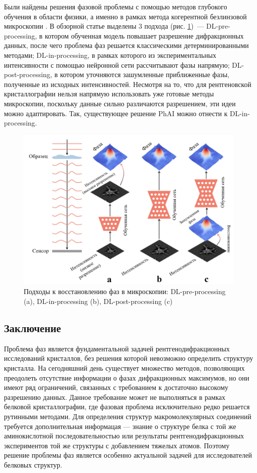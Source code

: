 Были найдены решения фазовой проблемы с помощью методов глубокого обучения в области физики, а именно в рамках метода когерентной безлинзовой микроскопии \cite{wang_use_2024}. В обзорной статье выделены 3 подхода (рис. \ref{dl})~--- DL-pre-processing, в котором обученная модель повышает разрешение дифракционных данных, после чего проблема фаз решается классическими детерминированными методами; DL-in-processing, в рамках которого из экспериментальных интенсивности с помощью нейронной сети рассчитывают фазы напрямую; DL-post-processing, в котором уточняются зашумленные приближенные фазы, полученные из исходных интенсивностей. Несмотря на то, что для рентгеновской кристаллографии нельзя напрямую использовать уже готовые методы микроскопии, поскольку данные сильно различаются разрешением, эти идеи можно адаптировать. Так, существующее решение PhAI \cite{larsen_phai_2024} можно отнести к DL-in-processing.

\begin{figure}[H]
	\centering
	\includegraphics[width=1\textwidth]{figures/dl.png}\hfill
	\caption{Подходы к восстановлению фаз в микроскопии: DL-pre-processing (a), DL-in-processing (b), DL-post-processing (c) \cite{wang_use_2024}}
	\label{dl}
\end{figure}

\subsection{Заключение}

Проблема фаз является фундаментальной задачей рентгенодифракционных исследований кристаллов, без решения которой невозможно определить структуру кристалла. На сегодняшний день существует множество методов, позволяющих преодолеть отсутствие информации о фазах дифракционных максимумов, но они имеют ряд ограничений, связанных с требованием к достаточно высокому разрешению данных. Данное требование может не выполняться в рамках белковой кристаллографии, где фазовая проблема исключительно редко решается рутинными методами. Для определения структур макромолекулярных соединений требуется дополнительная информацая — знание о структуре белка с той же аминокислотной последовательностью или результаты рентгенодифракционных экспериментов той же структуры с добавлением тяжелых атомов. Поэтому решение проблемы фаз является особенно актуальной задачей для исследователей белковых структур.

